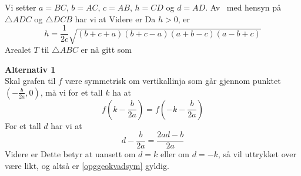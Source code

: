 





\newpage
{}
Vi setter $ a=BC $, $ b=AC $, $ c=AB $, $ h=CD $ og $ d=AD $. Av \pyt\ med hensyn på $ \triangle ADC $ og $ \triangle DCB $ har vi at
Videre er
Da $ h>0 $, er
\[ h=\frac{1}{2c}\sqrt{(b+c+a)(b+c-a)(a+b-c)(a-b+c)} \]
Arealet $ T $ til $ \triangle ABC $ er nå gitt som
\vsk

\newpage
{} \os
\textbf{Alternativ 1}\\
Skal grafen til $ f $ være symmetrisk om vertikallinja som går gjennom punktet $ \left(-\frac{b}{2a}, 0\right) $, må vi for et tall $ k $ ha at
\begin{equation}\label{opggeokvadsym}
	f\left(k-\frac{b}{2a}\right)=f\left(-k-\frac{b}{2a}\right)
\end{equation}
For et tall $ d $ har vi at
\[ d-\frac{b}{2a}=\frac{2ad-b}{2a} \]
Videre er
Dette betyr at uansett om $ d=k $ eller om $ d=-k $, så vil uttrykket over være likt, og altså er \eqref{opggeokvadsym} gyldig. \vsk

